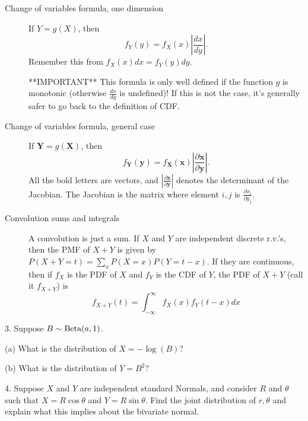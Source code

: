 \documentclass{article}
\begin{document}
\begin{description}
    \item[Change of variables formula, one dimension] If $Y = g(X)$, then $$f_Y(y) = f_X(x)\left|\frac{dx}{dy}\right|.$$
    Remember this from $f_X(x)dx = f_Y(y)dy$.

    **IMPORTANT** This formula is only well defined if the function $g$ is monotonic (otherwise $\frac{dx}{dy}$ is undefined)! If this is not the case, it's generally safer to go back to the definition of CDF.
    
    \item[Change of variables formula, general case] If $\mathbf{Y} = g(\mathbf{X})$, then $$f_\mathbf{Y}(\mathbf{y}) = f_\mathbf{X}(\mathbf{x})\left|\frac{\partial \mathbf{x}}{\partial \mathbf{y}}\right|.$$
    All the bold letters are vectors, and $\left|\frac{\partial \mathbf{x}}{\partial \mathbf{y}}\right|$ denotes the determinant of the Jacobian. The Jacobian is the matrix where element $i, j$ is $\frac{\partial x_i}{\partial y_j}$.
    
    \item[Convolution sums and integrals] A convolution is just a sum. If $X$ and $Y$ are independent discrete r.v.'s, then the PMF of $X+Y$ is given by $P(X+Y=t) = \sum_x P(X=x)P(Y=t-x)$. If they are continuous, then if $f_X$ is the PDF of $X$ and $f_Y$ is the CDF of $Y$, the PDF of $X+Y$ (call it $f_{X+Y}$) is 
    $$f_{X+Y}(t) = \int_{-\infty}^{\infty} f_X(x)f_Y(t-x) dx
    $$
\end{description}

3. Suppose $B \sim \textrm{Beta}(a, 1)$. 

(a) What is the distribution of $X = -\log(B)$? 


(b) What is the distribution of $Y = B^2$?


4. Suppose $X$ and $Y$ are independent standard Normals, and consider $R$ and $\theta$ such that $X = R\cos\theta$ and $Y = R\sin\theta$. Find the joint distribution of $r, \theta$ and explain what this implies about the bivariate normal.
\end{document}
